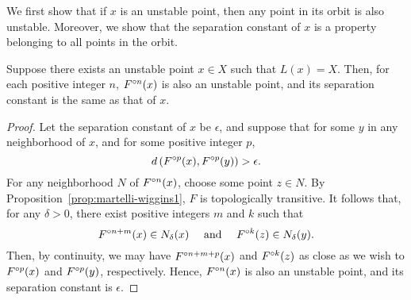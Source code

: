 \documentclass[12pt,draft,twoside]{book}
\begin{document}
We first show that if $x$ is an unstable point, then any point in its orbit is also unstable.
Moreover, we show that the separation constant of $x$ is a property belonging to all points in the orbit.
\begin{proposition}
  Suppose there exists an unstable point $x \in X$ such that $L(x) = X$.
  Then, for each positive integer $n$, $F^{\circ n}(x)$ is also an unstable point, and its separation constant is the same as that of $x$.
  \label{prop:unstable-orbit}
  \begin{proof}
    Let the separation constant of $x$ be $\epsilon$, and suppose that for some $y$ in any neighborhood of $x$, and for some positive integer $p$,
    \begin{equation*}
      d\left( F^{\circ p}(x), F^{\circ p}(y) \right) > \epsilon.
    \end{equation*}
    For any neighborhood $N$ of $F^{\circ n}(x)$, choose some point $z \in N$.
    By Proposition~\ref{prop:martelli-wiggins1}, $F$ is topologically transitive.
    It follows that, for any $\delta > 0$, there exist positive integers $m$ and $k$ such that
    \begin{equation*}
      F^{\circ n+m}(x) \in N_{\delta}(x)
      \quad \mbox{ and } \quad
      F^{\circ k}(z) \in N_{\delta}(y).
    \end{equation*}
    Then, by continuity, we may have $F^{\circ n+m+p}(x)$ and $F^{\circ k}(z)$ as close as we wish to $F^{\circ p}(x)$ and $F^{\circ p}(y)$, respectively.
    Hence, $F^{\circ n}(x)$ is also an unstable point, and its separation constant is $\epsilon$.
  \end{proof}
\end{proposition}
\end{document}
